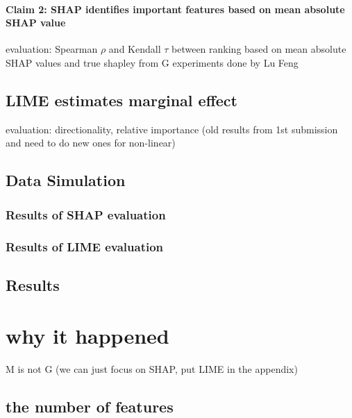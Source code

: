 \documentclass[11pt]{article}
\begin{document}



\paragraph{Claim 2: SHAP identifies important features based on mean absolute SHAP value}
evaluation: Spearman $\rho$ and Kendall $\tau$ between ranking based on mean absolute SHAP values and true shapley from G
experiments done by Lu Feng 


\subsection*{LIME estimates marginal effect}

evaluation: directionality, relative importance (old results from 1st submission and need to do new ones for non-linear)


\subsection{Data Simulation}
\subsubsection{Results of SHAP evaluation}
\subsubsection{Results of LIME evaluation}
\subsection{Results}




\section{why it happened}
M is not G (we can just focus on SHAP, put LIME in the appendix)

\subsection{the number of features}
\end{document}
